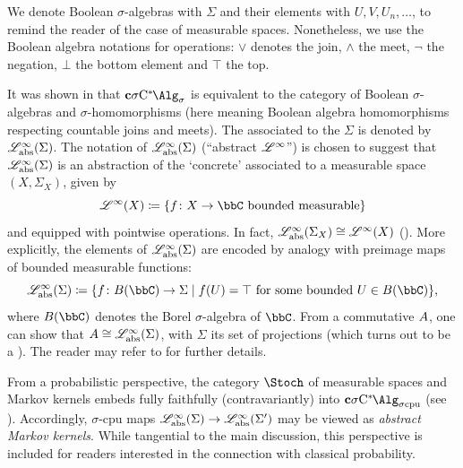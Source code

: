 \begin{notation}
	We denote Boolean $\sigma$-algebras with $\Sigma$ and their elements with $U,V,U_n, \dots$, to remind the reader of the case of measurable spaces.
	Nonetheless, we use the Boolean algebra notations for operations: $\vee$ denotes the join, $\wedge$ the meet, $\neg$ the negation, $\bot$ the bottom element and $\top$ the top.
\end{notation}

It was shown in \cite[Theorem 4.1.34]{fritz2025categories} that $\cSigmaC$ is equivalent to the category of Boolean $\sigma$-algebras and $\sigma$-homomorphisms (here meaning Boolean algebra homomorphisms respecting countable joins and meets).
The \cstars{} associated to the \bsigma{} $\Sigma$ is denoted by $\mathscr{L}_{\operatorname{abs}}^{\infty}(\Sigma)$.
The notation of $\mathscr{L}_{\operatorname{abs}}^{\infty}(\Sigma)$ (``abstract $\mathscr{L}^{\infty}$'') is chosen to suggest that $\mathscr{L}_{\operatorname{abs}}^{\infty}(\Sigma)$ is an abstraction of the `concrete' \cstars{} associated to a measurable space $(X,\Sigma_X)$, given by
\[
	\Linf(X)\coloneqq \lbrace f\colon X \to \bbC \text{ bounded measurable}\rbrace
\]
and equipped with pointwise operations.
In fact, $\mathscr{L}_{\operatorname{abs}}^{\infty}(\Sigma_X)\cong \mathscr{L}^{\infty}(X)$ (\cite[Lemma 4.1.14]{fritz2025categories}).
More explicitly, the elements of $\mathscr{L}_{\operatorname{abs}}^{\infty}(\Sigma)$ are encoded by analogy with preimage maps of bounded measurable functions:
\[
	\Linfbool(\Sigma)\coloneqq \lbrace f\colon B(\bbC)\to \Sigma \mid f(U)=\top \text{ for some bounded }U \in B(\bbC) \rbrace,
\]
where $B(\bbC)$ denotes the Borel $\sigma$-algebra of $\bbC$.
From a commutative \cstars{} ${A}$, one can show that ${A} \cong \mathscr{L}_{\operatorname{abs}}^{\infty}(\Sigma)$, with $\Sigma$ its set of projections (which turns out to be a \bsigma{}).
The reader may refer to \cite[Section 4.1]{fritz2025categories} for further details.

From a probabilistic perspective, the category $\Stoch$ of measurable spaces and Markov kernels embeds fully faithfully (contravariantly) into  $\cSigmaCcpu$ (see \cite[Proposition 4.3.6]{fritz2025categories}). Accordingly, $\sigma$-cpu maps $\mathscr{L}_{\operatorname{abs}}^{\infty}(\Sigma)\to \mathscr{L}_{\operatorname{abs}}^{\infty}(\Sigma')$ may be viewed as \emph{abstract Markov kernels}.
While tangential to the main discussion, this perspective is included for readers interested in the connection with classical probability.

